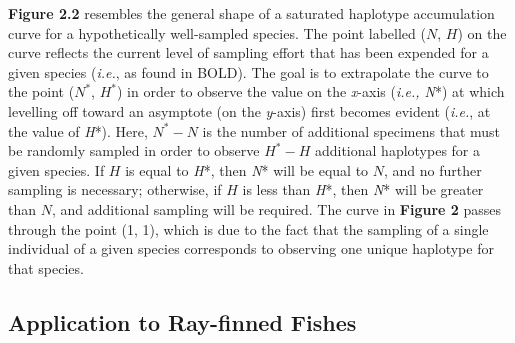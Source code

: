 \noindent \textbf{Figure 2.2} resembles the general shape of a saturated haplotype accumulation curve for a hypothetically well-sampled species. The point labelled ($N$, $H$) on the curve reflects the current level of sampling effort that has been expended for a given species (\textit{i.e.}, as found in BOLD). The goal is to extrapolate the curve to the point ($N^*$, $H^*$) in order to observe the value on the \textit{x}-axis (\textit{i.e., N}*) at which levelling off toward an asymptote (on the \textit{y}-axis) first becomes evident (\textit{i.e.}, at the value of \textit{H}*). Here, $N^*-N$ is the number of additional specimens that must be randomly sampled in order to observe $H^*-H$ additional haplotypes for a given species. If $H$ is equal to \textit{H}*, then \textit{N}* will be equal to $N$, and no further sampling is necessary; otherwise, if $H$ is less than \textit{H}*, then \textit{N}* will be greater than $N$, and additional sampling will be required.  The curve in \textbf{Figure 2} passes through the point (1, 1), which is due to the fact that the sampling of a single individual of a given species corresponds to observing one unique haplotype for that species.

\vspace{5mm}

\subsection{Application to Ray-finned Fishes}

